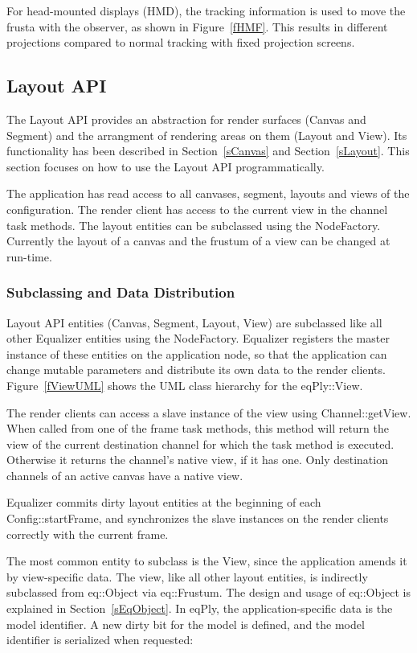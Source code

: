 \documentclass[10pt,a4]{scrartcl}
\newcommand{\fig}[1]{Figure~\ref{#1}}
\newcommand{\sref}[1]{Section~\ref{#1}}
\begin{document}
For head-mounted displays (HMD), the tracking information is used to
move the frusta with the observer, as shown in \fig{fHMF}. This results
in different projections compared to normal tracking with fixed
projection screens.

\subsection{\label{sLayoutAPI}Layout API}

The Layout API provides an abstraction for render surfaces (Canvas and
Segment) and the arrangment of rendering areas on them (Layout and
View). Its functionality has been described in \sref{sCanvas} and
\sref{sLayout}. This section focuses on how to use the Layout API
programmatically. 

The application has read access to all canvases, segment, layouts and
views of the configuration. The render client has access to the current
view in the channel task methods. The layout entities can be subclassed
using the \textsf{NodeFactory}. Currently the layout of a canvas and the
frustum of a view can be changed at run-time.


\subsubsection{Subclassing and Data Distribution}

Layout API entities (Canvas, Segment, Layout, View) are subclassed like
all other Equalizer entities using the \textsf{NodeFactory}. Equalizer
registers the master instance of these entities on the application node,
so that the application can change mutable parameters and distribute its
own data to the render clients. \fig{fViewUML} shows the UML class
hierarchy for the \textsf{eqPly::View}.

The render clients can access a slave instance of the view using
\textsf{Channel::getView}. When called from one of the frame task
methods, this method will return the view of the current destination
channel for which the task method is executed. Otherwise it returns the
channel's native view, if it has one. Only destination channels of an
active canvas have a native view.

Equalizer commits dirty layout entities at the beginning of each
\textsf{Config::startFrame}, and synchronizes the slave instances on the
render clients correctly with the current frame.

The most common entity to subclass is the \textsf{View}, since the
application amends it by view-specific data. The view, like all other
layout entities, is indirectly subclassed from \textsf{eq::Object} via
\textsf{eq::Frustum}. The design and usage of \textsf{eq::Object} is
explained in \sref{sEqObject}. In \textsf{eqPly}, the
application-specific data is the model identifier. A new dirty bit for
the model is defined, and the model identifier is serialized when
requested:
\end{document}
